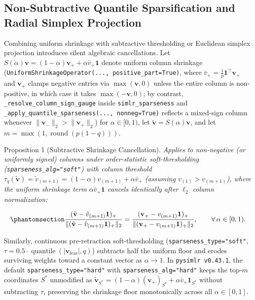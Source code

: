 \documentclass[
  10pt,
  letterpaper,
]{report}
\begin{document}
\subsection{Non-Subtractive Quantile Sparsification and Radial Simplex
Projection}\label{sec-non-subtractive-sparsification}

Combining uniform shrinkage with subtractive thresholding or Euclidean
simplex projection introduces silent algebraic cancellations. Let
\(S(\alpha)\mathbf{v} = (1 - \alpha)\mathbf{v}_+ + \alpha\bar{v}_+\mathbf{1}\)
denote uniform column shrinkage
(\texttt{UniformShrinkageOperator(...,\ positive\_part=True)}, where
\(\bar{v}_+ = \frac{1}{p}\mathbf{1}^\top \mathbf{v}_+\) and
\(\mathbf{v}_+\) clamps negative entries via \(\max(\mathbf{v}, 0)\)
unless the entire column is non-positive, in which case it takes
\(\max(-\mathbf{v}, 0)\); by contrast,
\texttt{\_resolve\_column\_sign\_gauge} inside
\texttt{simlr\_sparseness} and
\texttt{\_apply\_quantile\_sparseness(...,\ nonneg=True)} reflects a
mixed-sign column whenever \(\|\mathbf{v}_-\|_2 > \|\mathbf{v}_+\|_2\))
for \(\alpha \in [0, 1)\), let
\(\tilde{\mathbf{v}} = S(\alpha)\mathbf{v}\), and let
\(m = \max(1, \operatorname{round}(p(1 - q)))\).

Proposition 1 (Subtractive Shrinkage Cancellation). \emph{Applies to
non-negative (or uniformly signed) columns under order-statistic
soft-thresholding (\texttt{sparseness\_alg="soft"}) with column
threshold
\(\tau_q(\tilde{\mathbf{v}}) = \tilde{v}_{(m+1)} = (1 - \alpha)v_{(m+1)} + \alpha\bar{v}_+\)
(assuming \(v_{(1)} > v_{(m+1)}\)), where the uniform shrinkage term
\(\alpha\bar{v}_+\mathbf{1}\) cancels identically after \(\ell_2\)
column normalization:}

\begin{equation}\protect\phantomsection\label{eq-prop1-cancellation}{
\frac{(\tilde{\mathbf{v}} - \tilde{v}_{(m+1)}\mathbf{1})_+}{\|(\tilde{\mathbf{v}} - \tilde{v}_{(m+1)}\mathbf{1})_+\|_2}
= \frac{(\mathbf{v}_+ - v_{(m+1)}\mathbf{1})_+}{\|(\mathbf{v}_+ - v_{(m+1)}\mathbf{1})_+\|_2}, \qquad \forall\,\alpha \in [0, 1).
}\end{equation}

Similarly, continuous pre-retraction soft-thresholding
(\texttt{sparseness\_type="soft"},
\(\tau = 0.5 \cdot \operatorname{quantile}(|\mathbf{v}_{\text{feas}}|, q)\))
subtracts half the uniform floor and erodes surviving weights toward a
constant vector as \(\alpha \to 1\). In \texttt{pysimlr\ v0.43.1}, the
default \texttt{sparseness\_type="hard"} with
\texttt{sparseness\_alg="hard"} keeps the top-\(m\) coordinates \(S^*\)
unmodified as
\(\tilde{\mathbf{v}}_{S^*} = (1 - \alpha)(\mathbf{v}_+)_{S^*} + \alpha\bar{v}_+\mathbf{1}_{S^*}\)
without subtracting \(\tau\), preserving the shrinkage floor
monotonically across all \(\alpha \in [0, 1]\).
\end{document}
